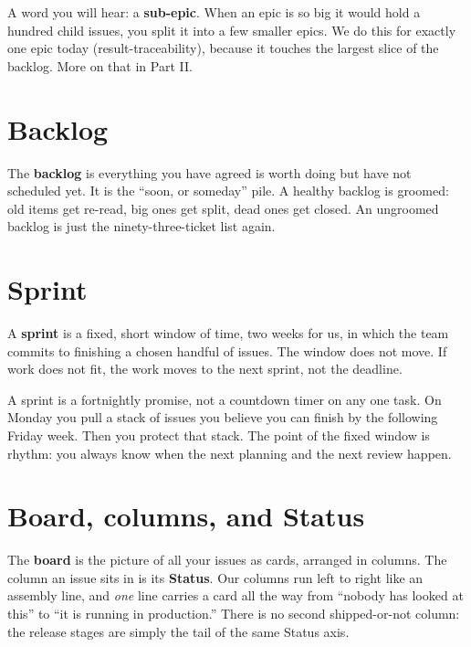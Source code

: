 \documentclass[11pt,a4paper]{report}
\begin{document}
A word you will hear: a \textbf{sub-epic}. When an epic is so big it would hold a
hundred child issues, you split it into a few smaller epics. We do this for exactly
one epic today (result-traceability), because it touches the largest slice of the
backlog. More on that in Part II.

\section{Backlog}
The \textbf{backlog} is everything you have agreed is worth doing but have not
scheduled yet. It is the ``soon, or someday'' pile. A healthy backlog is groomed:
old items get re-read, big ones get split, dead ones get closed. An ungroomed
backlog is just the ninety-three-ticket list again.

\section{Sprint}
A \textbf{sprint} is a fixed, short window of time, two weeks for us, in which the
team commits to finishing a chosen handful of issues. The window does not move. If
work does not fit, the work moves to the next sprint, not the deadline.

\begin{plainenglish}
A sprint is a fortnightly promise, not a countdown timer on any one task. On Monday
you pull a stack of issues you believe you can finish by the following Friday week.
Then you protect that stack. The point of the fixed window is rhythm: you always
know when the next planning and the next review happen.
\end{plainenglish}

\section{Board, columns, and Status}
The \textbf{board} is the picture of all your issues as cards, arranged in columns.
The column an issue sits in is its \textbf{Status}. Our columns run left to right
like an assembly line, and \emph{one} line carries a card all the way from ``nobody
has looked at this'' to ``it is running in production.'' There is no second
shipped-or-not column: the release stages are simply the tail of the same Status
axis.
\end{document}
